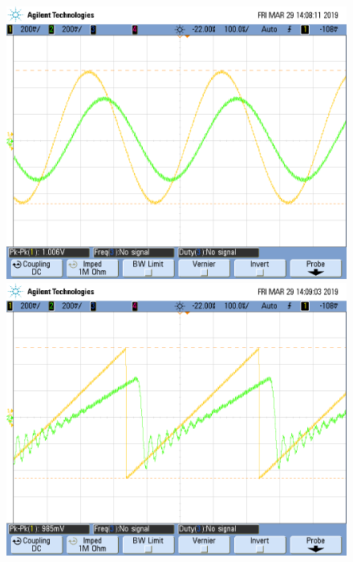 \documentclass[../../ASSD_TP1_G7.tex]{subfiles}
\begin{document}
\begin{figure}[H]

\begin{centering}
\includegraphics[scale=0.25]{Imagenes/llave_senooo_pto_a1}\includegraphics[scale=0.25]{Imagenes/llave_diente_pto_a}
\par\end{centering}

\end{figure}
\end{document}
